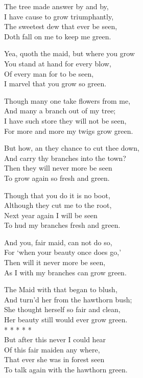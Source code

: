 \medskip



\settowidth{\versewidth}{But how, an they chance to cut thee do,}

\begin{dcverse}The tree made answer by and by,\\
I have cause to grow triumphantly,\\
The sweetest dew that ever be seen,\\
Doth fall on me to keep me green.

Yea, quoth the maid, but where you grow\\
You stand at hand for every blow,\\
Of every man for to be seen,\\
I marvel that you grow so green.

Though many one take flowers from me,\\
And many a branch out of my tree;\\
I have such store they will not be seen,\\
For more and more my twigs grow green.

But how, an they chance to cut thee down,\\
And carry thy branches into the town?\\
Then they will never more be seen\\
To grow again so fresh and green.
\end{dcverse}
\pagebreak

\settowidth{\versewidth}{Though that you do it is no hoot,}
\begin{dcverse}
Though that you do it is no boot,\\
Although they cut me to the root,\\
Next year again I will be seen\\
To hud my branches fresh and green.

And you, fair maid, can not do so,\\
For ‘when your beauty once does go,’\\
Then will it never more be seen,\\
As I with my branches can grow green.

The Maid with that began to blush,\\
And turn’d her from the hawthorn bush;\\
She thought herself so fair and clean,\\
Her beauty still would ever grow green.\\
\hspace{8em}* * * * *\\
But after this never I could hear\\
Of this fair maiden any where,\\
That ever she was in forest seen\\
To talk again with the hawthorn green.
\end{dcverse}


